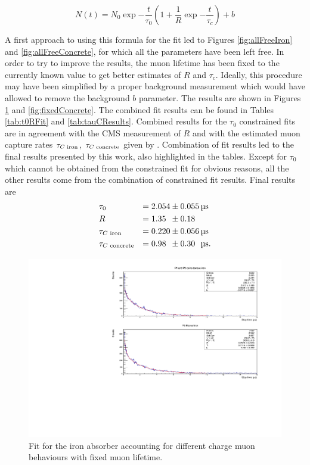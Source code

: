 \documentclass[../main.tex]{subfiles}
\begin{document}
\begin{equation}
\label{eq:finalFit}
    N(t) = N_0 \exp{-\frac{t}{\tau_0}}(1+\frac{1}{R}\exp{-\frac{t}{\tau_c}})+b
\end{equation}

A first approach to using this formula for the fit led to Figures \ref{fig:allFreeIron} and \ref{fig:allFreeConcrete}, for which all the parameters have been left free. In order to try to improve the results, the muon lifetime has been fixed to the currently known value to get better estimates of $R$ and $\tau_c$. Ideally, this procedure may have been simplified by a proper background measurement which would have allowed to remove the background $b$ parameter. The results are shown in Figures \ref{fig:fixedIron} and \ref{fig:fixedConcrete}. The combined fit results can be found in Tables \ref{tab:t0RFit} and \ref{tab:tauCResults}. Combined results for the $\tau_0$ constrained fits are in agreement with the CMS measurement of $R$ \cite{khachatryan2010measurement} and with the estimated muon capture rates $\tau_{C\textnormal{ iron}}$, $\tau_{C\textnormal{ concrete}}$ given by \cite{nayel2018characterisation,suzuki1987total}. Combination of fit results led to the final results presented by this work, also highlighted in the tables. Except for $\tau_0$ which cannot be obtained from the constrained fit for obvious reasons, all the other results come from the combination of constrained fit results. Final results are
\begin{alignat*}{3}
    &\tau_0 & =2.054&\pm 0.055\, \si{\micro \second} \\
    &R &=1.35\phantom{0}&\pm 0.18\phantom{0} \\
    &\tau_{C\textnormal{ iron}} & =0.220&\pm 0.056\, \si{\micro \second} \\
    &\tau_{C\textnormal{ concrete}} & =0.98\phantom{0}&\pm 0.30\phantom{0}\, \si{\micro \second}.
\end{alignat*}

\FloatBarrier
\begin{figure}[htb!]
    \centering
    \includegraphics[width=0.9 \linewidth]{images/fixed_lifetime_fit_iron.pdf}
    \caption{Fit for the iron absorber accounting for different charge muon behaviours with fixed muon lifetime.}
    \label{fig:fixedIron}
\end{figure}
\end{document}
